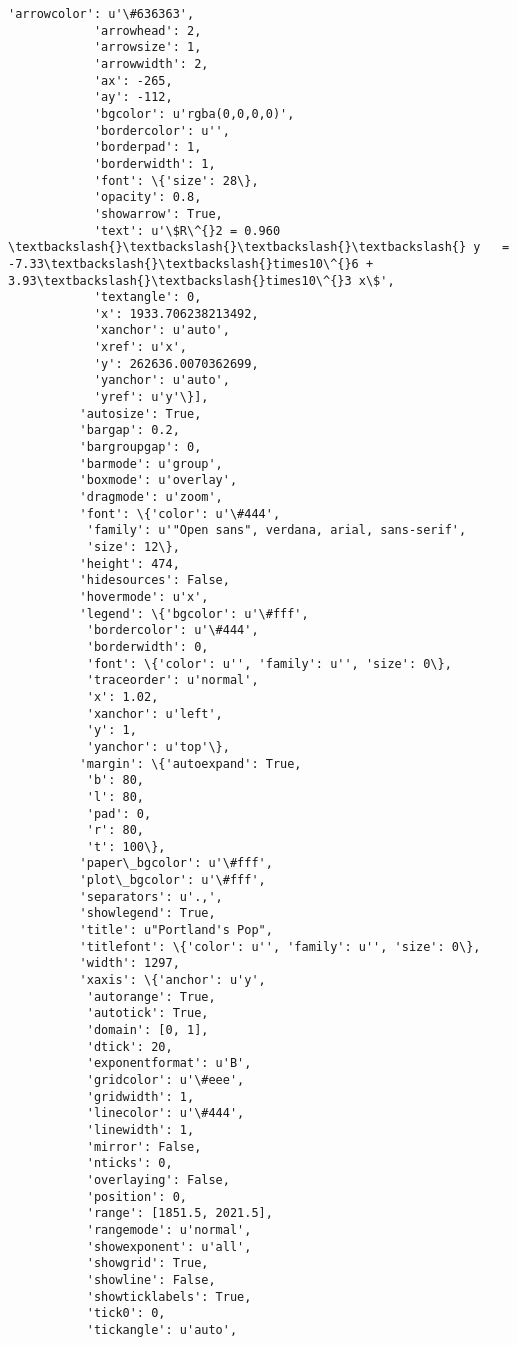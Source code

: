 \documentclass{article}
\begin{document}
\begin{Verbatim}[commandchars=\\\{\}]
            'arrowcolor': u'\#636363',
            'arrowhead': 2,
            'arrowsize': 1,
            'arrowwidth': 2,
            'ax': -265,
            'ay': -112,
            'bgcolor': u'rgba(0,0,0,0)',
            'bordercolor': u'',
            'borderpad': 1,
            'borderwidth': 1,
            'font': \{'size': 28\},
            'opacity': 0.8,
            'showarrow': True,
            'text': u'\$R\^{}2 = 0.960 \textbackslash{}\textbackslash{}\textbackslash{}\textbackslash{} y   = -7.33\textbackslash{}\textbackslash{}times10\^{}6 + 3.93\textbackslash{}\textbackslash{}times10\^{}3 x\$',
            'textangle': 0,
            'x': 1933.706238213492,
            'xanchor': u'auto',
            'xref': u'x',
            'y': 262636.0070362699,
            'yanchor': u'auto',
            'yref': u'y'\}],
          'autosize': True,
          'bargap': 0.2,
          'bargroupgap': 0,
          'barmode': u'group',
          'boxmode': u'overlay',
          'dragmode': u'zoom',
          'font': \{'color': u'\#444',
           'family': u'"Open sans", verdana, arial, sans-serif',
           'size': 12\},
          'height': 474,
          'hidesources': False,
          'hovermode': u'x',
          'legend': \{'bgcolor': u'\#fff',
           'bordercolor': u'\#444',
           'borderwidth': 0,
           'font': \{'color': u'', 'family': u'', 'size': 0\},
           'traceorder': u'normal',
           'x': 1.02,
           'xanchor': u'left',
           'y': 1,
           'yanchor': u'top'\},
          'margin': \{'autoexpand': True,
           'b': 80,
           'l': 80,
           'pad': 0,
           'r': 80,
           't': 100\},
          'paper\_bgcolor': u'\#fff',
          'plot\_bgcolor': u'\#fff',
          'separators': u'.,',
          'showlegend': True,
          'title': u"Portland's Pop",
          'titlefont': \{'color': u'', 'family': u'', 'size': 0\},
          'width': 1297,
          'xaxis': \{'anchor': u'y',
           'autorange': True,
           'autotick': True,
           'domain': [0, 1],
           'dtick': 20,
           'exponentformat': u'B',
           'gridcolor': u'\#eee',
           'gridwidth': 1,
           'linecolor': u'\#444',
           'linewidth': 1,
           'mirror': False,
           'nticks': 0,
           'overlaying': False,
           'position': 0,
           'range': [1851.5, 2021.5],
           'rangemode': u'normal',
           'showexponent': u'all',
           'showgrid': True,
           'showline': False,
           'showticklabels': True,
           'tick0': 0,
           'tickangle': u'auto',

\end{Verbatim}
\end{document}
